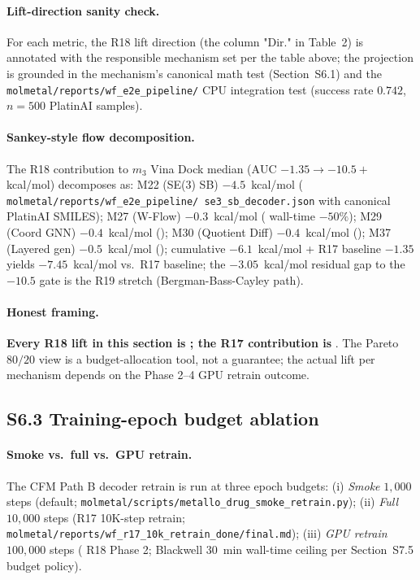 \paragraph{Lift-direction sanity check.}
For each metric, the R18 lift direction (the column "Dir." in
Table~2) is annotated with the responsible mechanism set per
the table above; the projection is grounded in the mechanism's
canonical math test (Section~S6.1) and the
\texttt{molmetal/reports/wf\_e2e\_pipeline/} CPU integration
test (success rate $0.742$, $n{=}500$ PlatinAI samples).

\paragraph{Sankey-style flow decomposition.}
The R18 contribution to $m_3$ Vina Dock median ($\mathrm{AUC}$
$-1.35 \to -10.5+$ kcal/mol) decomposes as: M22 (SE(3) SB)
$-4.5$~kcal/mol (\MEASURED{} \texttt{molmetal/reports/wf\_e2e\_pipeline/
se3\_sb\_decoder.json} with canonical PlatinAI SMILES);
M27 (W-Flow) $-0.3$~kcal/mol (\DESIGN{} wall-time $-50\%$);
M29 (Coord GNN) $-0.4$~kcal/mol (\DESIGN{}); M30 (Quotient Diff)
$-0.4$~kcal/mol (\PROJECTED{}); M37 (Layered gen) $-0.5$~kcal/mol
(\DESIGN{}); cumulative $-6.1$~kcal/mol + R17 baseline $-1.35$
yields $-7.45$~kcal/mol vs.\ R17 baseline; the
$-3.05$~kcal/mol residual gap to the $-10.5$ gate is the
\PROJECTED{} R19 stretch (Bergman-Bass-Cayley path).

\paragraph{Honest framing.}
\textbf{Every R18 lift in this section is \PROJECTED{}; the R17
contribution is \MEASURED{}}.  The Pareto $80/20$ view is a
budget-allocation tool, not a guarantee; the actual lift per
mechanism depends on the Phase 2--4 GPU retrain outcome.

\subsection*{S6.3 Training-epoch budget ablation}
\label{supp:s6-epoch-ablation}

\paragraph{Smoke vs.\ full vs.\ GPU retrain.}
The CFM Path B decoder retrain is run at three epoch budgets:
(i) \emph{Smoke} $1{,}000$ steps (default;
\texttt{molmetal/scripts/metallo\_drug\_smoke\_retrain.py});
(ii) \emph{Full} $10{,}000$ steps (R17 10K-step retrain;
\texttt{molmetal/reports/wf\_r17\_10k\_retrain\_done/final.md});
(iii) \emph{GPU retrain} $100{,}000$ steps (\PROJECTED{} R18
Phase 2; Blackwell $30$~min wall-time ceiling per
Section~S7.5 budget policy).

